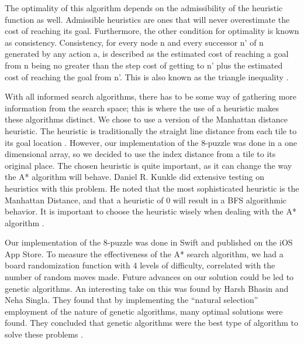 \documentclass{article}
\begin{document}
The optimality of this algorithm depends on the admissibility of the heuristic function as well. Admissible heuristics are ones that will never overestimate the cost of reaching its goal. Furthermore, the other condition for optimality is known as consistency. Consistency, for every node n and every successor n’ of n generated by any action a,  is described as the estimated cost of reaching a goal from n being no greater than the step cost of getting to n’ plus the estimated cost of reaching the goal from n’. This is also known as the triangle inequality \cite{russell2002artificial}.
\newline

With all informed search algorithms, there has to be some way of gathering more information from the search space; this is where the use of a heuristic makes these algorithms distinct. We chose to use a version of the Manhattan distance heuristic. The heuristic is traditionally the straight line distance from each tile to its goal location \cite{burns2012implementing}. However, our implementation of the 8-puzzle was done in a one dimensional array, so we decided to use the index distance from a tile to its original place. The chosen heuristic is quite important, as it can change the way the A* algorithm will behave. Daniel R. Kunkle did extensive testing on heuristics with this problem. He noted that the most sophisticated heuristic is the Manhattan Distance, and that a heuristic of 0 will result in a BFS algorithmic behavior. It is important to choose the heuristic wisely when dealing with the A* algorithm \cite{kunkle2001solving}.
\newline

Our implementation of the 8-puzzle was done in Swift and published on the iOS App Store. To measure the effectiveness of the A* search algorithm, we had a board randomization function with 4 levels of difficulty, correlated with the number of random moves made. Future advances on our solution could be led to genetic algorithms. An interesting take on this was found by Harsh Bhasin and Neha Singla. They found that by implementing the “natural selection” employment of the nature of genetic algorithms, many optimal solutions were found. They concluded that genetic algorithms were the best type of algorithm to solve these problems \cite{bhasin2012genetic}.
\newpage



\end{document}
